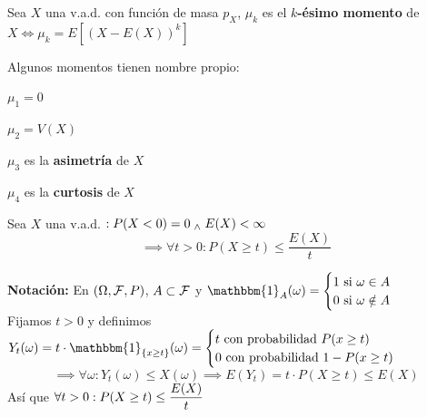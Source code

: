 \begin{defn}[Momentos de $X$]
	Sea $X$ una v.a.d. con función de masa $p_X$, $\mu_k$ es el \textbf{$k$-ésimo momento} de $X \iff \mu_k= E\left[(X-E(X))^k\right]$
\end{defn}

\begin{obs} Algunos momentos tienen nombre propio: \\
	\begin{enumerate*}[itemjoin=\hspace{1cm}]
		\item $\mu_1=0$
		\item $\mu_2=V(X)$
		\item $\mu_3$ es la \textbf{asimetría} de $X$
		\item $\mu_4$ es la \textbf{curtosis} de $X$
	\end{enumerate*}
\end{obs}

\begin{teo}
	Sea $X$ una v.a.d. $: P(X<0)=0 \; _{\wedge} \; E(X)<\infty$
	\[\implies \forall t >0 : P(X\geq t) \leq \frac{E(X)}{t}\]
	\begin{dem}
		\textbf{Notación:} En $(\Omega, \mathcal{F}, P)$, $A\subset \mathcal{F}$ y $\ds \mathbbm{1}_A(\omega) = \begin{cases}
				1 \tex{ si } \omega \in A \\
				0 \tex{ si } \omega \notin A
			\end{cases}$ \\
		Fijamos $t>0$ y definimos $Y_t(\omega)=t\cdot \mathbbm{1}_{\{x\geq t\}}(\omega)=\begin{cases}
				t \tex{ con probabilidad } P(x\geq t) \\
				0 \tex{ con probabilidad } 1-P(x\geq t)
			\end{cases}$
		\[\implies \forall \omega : Y_t(\omega)\leq X(\omega) \implies E(Y_t)=t\cdot P(X\geq t)\leq E(X)\]
		Así que $\displaystyle \forall t >0 : P(X\geq t) \leq \frac{E(X)}{t}$
	\end{dem}
\end{teo}

